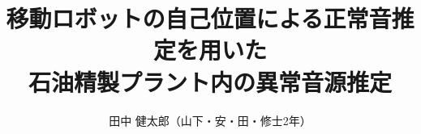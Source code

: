 \documentclass{/workdir/classes/minithesis2024j}
\begin{document}
\title{移動ロボットの自己位置による正常音推定を用いた\\石油精製プラント内の異常音源推定}
\author{田中 健太郎（山下・安・田・修士2年）}

\setlength{\baselineskip}{4.4mm}

\maketitle

\thispagestyle{empty}
\pagestyle{empty}









\end{document}
